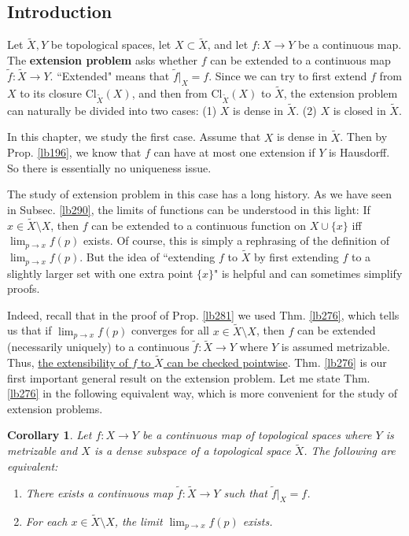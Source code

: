 \documentclass[12pt,b5paper,notitlepage]{article}
\theoremstyle{definition}
\theoremstyle{plain}
\newtheorem{co}[df]{Corollary}
\newcommand{\wtd}{\widetilde}
\newcommand{\Cl}{\mathrm{Cl}}
\numberwithin{equation}{section}
\begin{document}
\subsection{Introduction}

Let $\wtd X,Y$ be topological spaces, let $X\subset \wtd X$, and let $f:X\rightarrow Y$ be a continuous map. The \textbf{extension problem} asks whether $f$ can be extended to a continuous map $\wtd f:\wtd X\rightarrow Y$. ``Extended" means that $\wtd f|_X=f$.  Since we can try to first extend $f$ from $X$ to its closure $\Cl_{\wtd X}(X)$, and then from $\Cl_{\wtd X}(X)$ to $\wtd X$, the extension problem can naturally be divided into two cases: (1) $X$ is dense in $\wtd X$. (2) $X$ is closed in $\wtd X$.

In this chapter, we study the first case. Assume that $X$ is dense in $\wtd X$. Then by Prop. \ref{lb196}, we know that $f$ can have at most one extension if $Y$ is Hausdorff. So there is essentially no uniqueness issue. 


The study of extension problem in this case has a long history. As we have seen in Subsec. \ref{lb290}, the limits of functions can be understood in this light: If $x\in\wtd X\setminus X$, then $f$ can be extended to a continuous function on $X\cup\{x\}$ iff $\lim_{p\rightarrow x}f(p)$ exists. Of course, this is simply a rephrasing of the definition of $\lim_{p\rightarrow x}f(p)$. But the idea of ``extending $f$ to $\wtd X$ by first extending $f$ to a slightly larger set with one extra point $\{x\}$" is helpful and can sometimes simplify proofs.

Indeed, recall that in the proof of Prop. \ref{lb281} we used Thm. \ref{lb276}, which tells us that if $\lim_{p\rightarrow x}f(p)$ converges for all $x\in\wtd X\setminus X$, then $f$ can be extended (necessarily uniquely) to a continuous $\wtd f:\wtd X\rightarrow Y$ where $Y$ is assumed metrizable. Thus, \uline{the extensibility of $f$ to $\wtd X$ can be checked pointwise}. Thm. \ref{lb276} is our first important general result on the extension problem. Let me state Thm. \ref{lb276} in the following equivalent way, which is more convenient for the  study of extension problems.
\begin{co}\label{lb307}
Let $f:X\rightarrow Y$ be a continuous map of topological spaces where $Y$ is metrizable and $X$ is a dense subspace of a topological space $\wtd X$. The following are equivalent:
\begin{enumerate}[label=(\arabic*)]
\item There exists a continuous map $\wtd f:\wtd X\rightarrow Y$ such that $\wtd f|_X= f$.
\item For each $x\in\wtd X\setminus X$, the limit $\lim_{p\rightarrow x}f(p)$ exists.
\end{enumerate}
\end{co}
\end{document}
